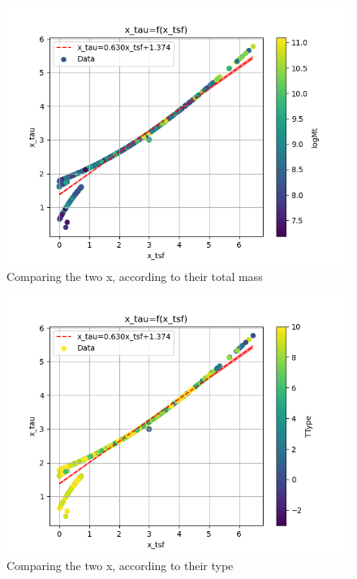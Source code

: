 \documentclass[a4paper,twocolumn]{article}
\begin{document}
\begin{figure}[htbp]
\centering
\includegraphics[width=.9\linewidth]{./figs/x_tsf-x_tau-color_logMt.png}
\caption{\label{fig:Comparing the two x, according to their total mass}Comparing the two x, according to their total mass}
\end{figure}

\begin{figure}[htbp]
\centering
\includegraphics[width=.9\linewidth]{./figs/x_tsf-x_tau-color_TType.png}
\caption{\label{fig:Comparing the two x, according to their type}Comparing the two x, according to their type}
\end{figure}
\end{document}
